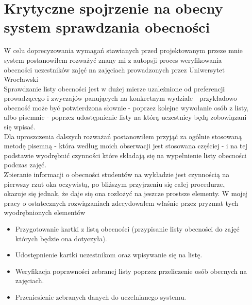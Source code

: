 \documentclass[declaration,shortabstract, mgr]{iithesis}
\begin{document}
\section{Krytyczne spojrzenie na obecny system sprawdzania obecności}
W celu doprecyzowania wymagań stawianych przed projektowanym przeze mnie system postanowiłem rozważyć znany mi z autopsji proces weryfikowania obecności uczestników zajęć na zajęciach prowadzonych przez Uniwersytet Wrocławski\\
\indent Sprawdzanie listy obecności jest w dużej mierze uzależnione od preferencji prowadzącego i zwyczajów panujących na konkretnym wydziale - przykładowo obecność może być potwierdzona słownie - poprzez kolejne wywołanie osób z listy, albo pisemnie - poprzez udostępnienie listy na którą uczestnicy będą zobowiązani się wpisać.\\
\indent Dla uproszczenia dalszych rozważań postanowiłem przyjąć za ogólnie stosowaną metodę pisemną - która według moich obserwacji jest stosowana częściej - i na tej podstawie wyodrębnić czynności które składają się na wypełnienie listy obecności podczas zajęć.\\
\indent Zbieranie informacji o obecności studentów na wykładzie jest czynnością na pierwszy rzut oka oczywistą, po bliższym przyjrzeniu się całej procedurze, okazuje się jednak, że daje się ona rozłożyć na jeszcze prostsze elementy. W mojej pracy o ostatecznych rozwiązaniach zdecydowałem właśnie przez pryzmat tych wyodrębnionych elementów\\

\begin{itemize}
\item Przygotowanie kartki z listą obecności (przypisanie listy obecności do zajęć których będzie ona dotyczyła).
\item Udostępnienie kartki uczestnikom oraz wpisywanie się na listę.
\item Weryfikacja poprawności zebranej listy poprzez przeliczenie osób obecnych na zajęciach.
\item Przeniesienie zebranych danych do uczelnianego systemu.
\end{itemize}
\end{document}
